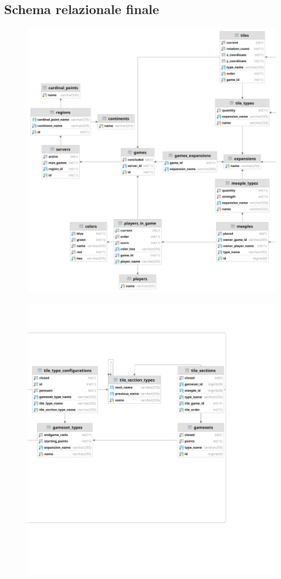 \subsection{Schema relazionale finale}
\clearpage
\begin{figure}[ht]
    \includegraphics[scale=0.175]{images/Progettazione/relazionale_left.png}
\end{figure}
\clearpage
\begin{figure}[ht]
    \includegraphics[width=1.247\textwidth, right]{images/Progettazione/relazionale_right.png}
\end{figure}

